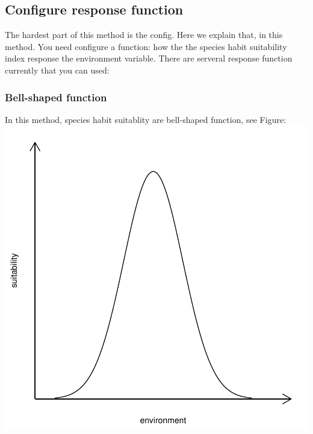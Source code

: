 \documentclass{report}
\begin{document}
\subsection*{Configure response function}
The hardest part of this method is the config. Here we explain that,
in this method. You need configure a function: how the the species habit suitability index
response the environment variable. There are serveral response function currently that you can used:

\subsubsection*{Bell-shaped function}
In this method, species habit suitablity are bell-shaped function, see Figure:
\includegraphics{sdmvspecies-bell_shaped_response_function}
\end{document}
